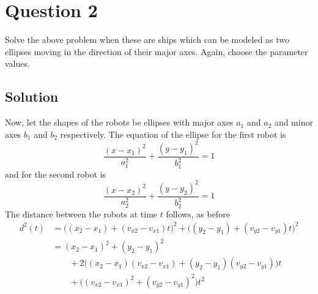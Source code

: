 \section*{Question 2}

Solve the above problem when these are ships which can be modeled as two ellipses moving in
the direction of their major axes.
Again, choose the parameter values.

\subsection*{Solution}

Now, let the shapes of the robots be ellipses with major axes \( a_1 \) and \( a_2 \) and minor axes \( b_1 \) and \( b_2 \) respectively.
The equation of the ellipse for the first robot is
\begin{equation*}
    \frac{(x - x_1)^2}{a_1^2} + \frac{(y - y_1)^2}{b_1^2} = 1
\end{equation*}
and for the second robot is
\begin{equation*}
    \frac{(x - x_2)^2}{a_2^2} + \frac{(y - y_2)^2}{b_2^2} = 1
\end{equation*}
The distance between the robots at time \( t \) follows, as before
\begin{align*}
    d^2(t)
     & =
    \big((x_2 - x_1) + (v_{x2} - v_{x1})t\big)^2 + \big((y_2 - y_1) + (v_{y2} - v_{y1})t\big)^2
    \\ & =
    (x_2 - x_1)^2 + (y_2 - y_1)^2
    \\ & \qquad
    + 2\big((x_2 - x_1)(v_{x2} - v_{x1}) + (y_2 - y_1)(v_{y2} - v_{y1})\big)t
    \\ & \qquad
    + \big((v_{x2} - v_{x1})^2 + (v_{y2} - v_{y1})^2\big)t^2
\end{align*}
